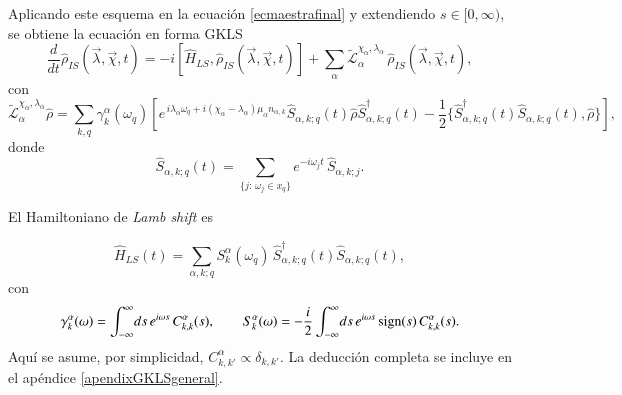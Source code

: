 Aplicando este esquema en la ecuación \eqref{ecmaestrafinal} y extendiendo \(s\in[0,\infty)\), se obtiene la ecuación en forma GKLS
\begin{equation}
    \frac{d}{dt}\hat{\rho}_{IS}(\vec{\lambda},\vec{\chi},t) 
    = -i[\hat{H}_{LS},\hat{\rho}_{IS}(\vec{\lambda},\vec{\chi},t)]
      + \sum_{\alpha}\tilde{\mathcal{L}}^{\chi_{\alpha},\lambda_{\alpha}}_{\alpha}\,
        \hat{\rho}_{IS}(\vec{\lambda},\vec{\chi},t),
    \label{ecmaestracounting}
\end{equation}
con
\begin{equation*}
    \tilde{\mathcal{L}}^{\chi_{\alpha},\lambda_{\alpha}}_{\alpha}\hat{\rho} 
    = \sum_{k,q}\gamma^{\alpha}_{k}(\omega_{q})
      \left[
        e^{\,i\lambda_{\alpha}\omega_{q} + i(\chi_{\alpha}-\lambda_{\alpha})\mu_{\alpha}n_{\alpha,k}}
        \hat{S}_{\alpha,k;q}(t)\hat{\rho}\hat{S}^{\dagger}_{\alpha,k;q}(t)
        - \frac{1}{2}\{\hat{S}^{\dagger}_{\alpha,k;q}(t)\hat{S}_{\alpha,k;q}(t),\hat{\rho}\}
      \right],
\end{equation*}
donde
\begin{equation*}
    \hat{S}_{\alpha,k;q}(t) = \sum_{\{j:\,\omega_{j}\in x_{q}\}} e^{-i\omega_{j}t}\,\hat{S}_{\alpha,k;j}.
\end{equation*}

El Hamiltoniano de \textit{Lamb shift} es 

\begin{equation*}
    \hat{H}_{LS}(t) = \sum_{\alpha,k;q} S^{\alpha}_{k}(\omega_{q})\,
    \hat{S}^{\dagger}_{\alpha,k;q}(t)\hat{S}_{\alpha,k;q}(t),
\end{equation*}
con
\begin{equation}
    \gamma_{k}^{\alpha}(\omega) = \int_{-\infty}^{\infty}\!ds\, e^{i\omega s}\,C^{\alpha}_{k,k}(s),
    \qquad
    S^{\alpha}_{k}(\omega) = - \frac{i}{2} \int_{-\infty}^{\infty}\!ds\, e^{i\omega s}\,\textnormal{sign}(s)\,C^{\alpha}_{k,k}(s).
    \label{sec2:gammaanddelta}
\end{equation}
Aquí se asume, por simplicidad, \(C^{\alpha}_{k,k'}\propto \delta_{k,k'}\). La deducción completa se incluye en el apéndice \ref{apendixGKLSgeneral}.

